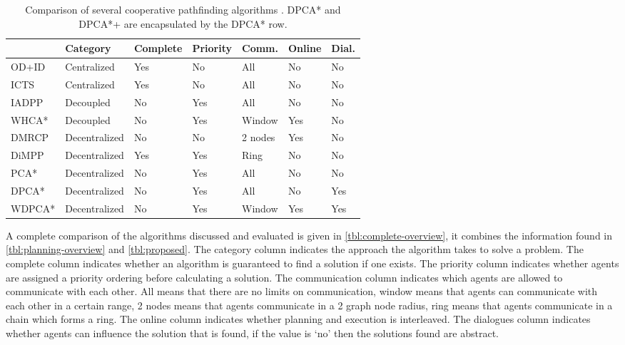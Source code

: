 \begin{table*}
    \centering
    \caption{Comparison of several cooperative pathfinding algorithms 
        \cite{standley2010,standley2011,sharon2013,cap2012,silver2005,wei2016,chouhan2017}.
        DPCA* and DPCA*+ are encapsulated by the DPCA* row.}
    \label{tbl:complete-overview}
    \begin{tabular}{l|l|l|l|l|l|l}
        & Category & Complete & Priority & Comm. & Online & Dial. \\
        \hline
        OD+ID & Centralized & Yes & No &
        All & No & No \\
        ICTS & Centralized & Yes & No & All & No & No \\
        IADPP & Decoupled & No & Yes & All & No & No \\
        WHCA* & Decoupled & No & Yes & Window & Yes & No \\
        DMRCP & Decentralized & No & No & 2 nodes & Yes & No \\
        DiMPP & Decentralized & Yes & Yes & Ring & No & No \\
        \hline
        PCA* & Decentralized & No & Yes & All & No & No \\
        DPCA* & Decentralized & No & Yes & All & 
        No & Yes \\
        WDPCA* & Decentralized & No & Yes & Window & Yes & Yes
    \end{tabular}
\end{table*}

A complete comparison of the algorithms discussed and evaluated is given in 
\autoref{tbl:complete-overview}, it combines the information found in 
\autoref{tbl:planning-overview} and \autoref{tbl:proposed}. The category column 
indicates the approach the algorithm takes to solve a problem. The complete 
column indicates whether an algorithm is guaranteed to find a solution if one 
exists. The priority column indicates whether agents are assigned a priority 
ordering before calculating a solution. The communication column indicates 
which agents are allowed to communicate with each other. All means that there 
are no limits on communication, window means that agents can communicate with 
each other in a certain range, 2 nodes means that agents communicate in a 2 
graph node radius, ring means that agents communicate in a chain which forms a 
ring. The online column indicates whether planning and execution is 
interleaved. The dialogues column indicates whether agents can influence the 
solution that is found, if the value is `no' then the solutions found are 
abstract.


